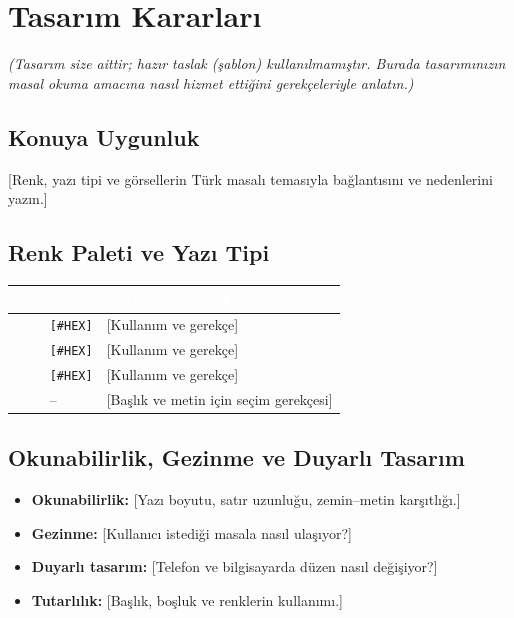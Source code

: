 \documentclass[12pt,a4paper]{article}
\newcommand{\aciklama}[1]{{\color{gray}\itshape (#1)}}
\begin{document}
\section{Tasarım Kararları}
\aciklama{Tasarım size aittir; hazır taslak (şablon) kullanılmamıştır. Burada
tasarımınızın masal okuma amacına nasıl hizmet ettiğini gerekçeleriyle anlatın.}

\subsection{Konuya Uygunluk}
[Renk, yazı tipi ve görsellerin Türk masalı temasıyla bağlantısını ve nedenlerini yazın.]

\subsection{Renk Paleti ve Yazı Tipi}
\begin{center}
\begin{tabular}{@{}llp{6.4cm}@{}}
\toprule
\rowcolor{ana}\textcolor{white}{\textbf{Ad}} & \textcolor{white}{\textbf{Kod}} & \textcolor{white}{\textbf{Nerede / neden kullandınız?}} \\
\midrule
{} & \texttt{[\#HEX]} & [Kullanım ve gerekçe] \\
 & \texttt{[\#HEX]} & [Kullanım ve gerekçe] \\
 & \texttt{[\#HEX]} & [Kullanım ve gerekçe] \\
 & -- & [Başlık ve metin için seçim gerekçesi] \\
\bottomrule
\end{tabular}
\end{center}

\subsection{Okunabilirlik, Gezinme ve Duyarlı Tasarım}
\begin{itemize}
  \item \textbf{Okunabilirlik:} [Yazı boyutu, satır uzunluğu, zemin--metin karşıtlığı.]
  \item \textbf{Gezinme:} [Kullanıcı istediği masala nasıl ulaşıyor?]
  \item \textbf{Duyarlı tasarım:} [Telefon ve bilgisayarda düzen nasıl değişiyor?]
  \item \textbf{Tutarlılık:} [Başlık, boşluk ve renklerin kullanımı.]
\end{itemize}
\end{document}
